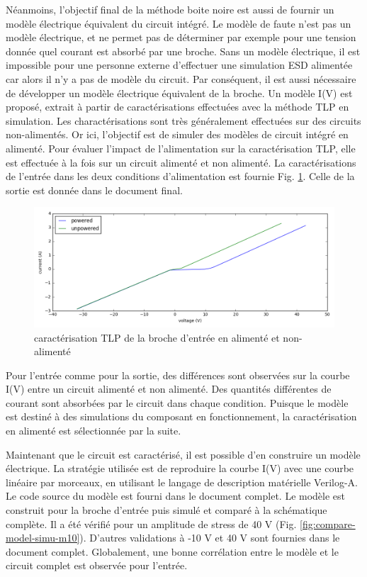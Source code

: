 Néanmoins, l'objectif final de la méthode boite noire est aussi de fournir un modèle électrique équivalent du circuit intégré.
Le modèle de faute n'est pas un modèle électrique, et ne permet pas de déterminer par exemple pour une tension donnée quel courant est absorbé par une broche.
Sans un modèle électrique, il est impossible pour une personne externe d'effectuer une simulation ESD alimentée car alors il n'y a pas de modèle du circuit.
Par conséquent, il est aussi nécessaire de développer un modèle électrique équivalent de la broche.
Un modèle I(V) est proposé, extrait à partir de caractérisations effectuées avec la méthode TLP en simulation.
Les charactérisations sont très généralement effectuées sur des circuits non-alimentés.
Or ici, l'objectif est de simuler des modèles de circuit intégré en alimenté.
Pour évaluer l'impact de l'alimentation sur la caractérisation TLP, elle est effectuée à la fois sur un circuit alimenté et non alimenté.
La caractérisations de l'entrée dans les deux conditions d'alimentation est fournie Fig. \ref{fig:tlp-input-cz}.
Celle de la sortie est donnée dans le document final.

\begin{figure}[!h]
  \centering
  \includegraphics[width=\textwidth]{src/1/figures/tlp_input_characterization.png}
  \caption{caractérisation TLP de la broche d'entrée en alimenté et non-alimenté}
  \label{fig:tlp-input-cz}
\end{figure}

Pour l'entrée comme pour la sortie, des différences sont observées sur la courbe I(V) entre un circuit alimenté et non alimenté.
Des quantités différentes de courant sont absorbées par le circuit dans chaque condition.
Puisque le modèle est destiné à des simulations du composant en fonctionnement, la caractérisation en alimenté est sélectionnée par la suite.

Maintenant que le circuit est caractérisé, il est possible d'en construire un modèle électrique.
La stratégie utilisée est de reproduire la courbe I(V) avec une courbe linéaire par morceaux, en utilisant le langage de description matérielle Verilog-A.
Le code source du modèle est fourni dans le document complet.
Le modèle est construit pour la broche d'entrée puis simulé et comparé à la schématique complète.
Il a été vérifié pour un amplitude de stress de 40 V (Fig. \ref{fig:compare-model-simu-m10}).
D'autres validations à -10 V et 40 V sont fournies dans le document complet.
Globalement, une bonne corrélation entre le modèle et le circuit complet est observée pour l'entrée.

